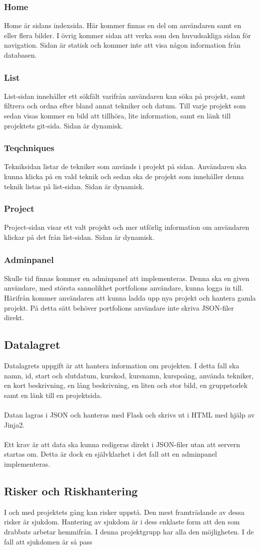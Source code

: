 \documentclass{TDP003mall}
\begin{document}
\subsubsection{Home}
Home är sidans indexsida. Här kommer finnas en del om användaren samt en eller flera bilder.
I övrig kommer sidan att verka som den huvudsakliga sidan för navigation. Sidan är 
statisk och kommer inte att visa någon information från databasen.

\subsubsection{List}
List-sidan innehåller ett sökfält varifrån användaren kan söka på projekt, samt filtrera
och ordna efter bland annat tekniker och datum. Till varje projekt som sedan 
visas kommer en bild att tillhöra, lite information, samt en länk till projektets git-sida.
Sidan är dynamisk.

\subsubsection{Teqchniques}
Tekniksidan listar de tekniker som används i projekt på sidan. Användaren ska kunna
klicka på en vald teknik och sedan ska de projekt som innehåller denna teknik listas
på list-sidan. Sidan är dynamisk.

\subsubsection{Project}
Project-sidan visar ett valt projekt och mer utförlig information om användaren
klickar på det från list-sidan. Sidan är dynamisk.

\subsubsection{Adminpanel}
Skulle tid finnas kommer en adminpanel att implementeras. Denna ska en given användare,
med största sannolikhet portfolions användare, kunna logga in till. Härifrån kommer
användaren att kunna ladda upp nya projekt och hantera gamla projekt. På detta
sätt behöver portfolions användare inte skriva JSON-filer direkt. 

\subsection{Datalagret}
Datalagrets uppgift är att hantera information om projekten. I detta fall ska
namn, id, start och slutdatum, kurskod, kursnamn, kurspoäng, använda tekniker,
en kort beskrivning, en lång beskrivning, en liten och stor bild, en gruppstorlek
samt en länk till en projektsida.\\\\
Datan lagras i JSON och hanteras med Flask och skrivs ut i HTML med hjälp av Jinja2.\\\\
Ett krav är att data ska kunna redigeras direkt i JSON-filer utan att servern startas om.
Detta är dock en självklarhet i det fall att en adminpanel implementeras.

\subsection{Risker och Riskhantering}
I och med projektets gång kan risker uppstå. Den mest framträdande av dessa risker
är sjukdom. Hantering av sjukdom är i dess enklaste form att den som drabbats arbetar hemmifrån.
I denna projektgrupp har alla den möjligheten. I de fall att sjukdomen är så pass
\end{document}
